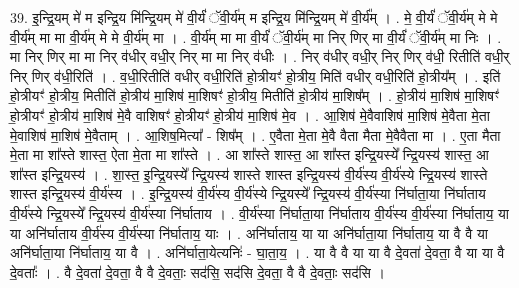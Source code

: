 \documentclass[17pt]{extarticle}
\begin{document}
39. इ॒न्द्रि॒यम् मे॑ म इन्द्रि॒य मि॑न्द्रि॒यम् मे॑ वी॒र्यं॑ ॅवी॒र्य॑म् म इन्द्रि॒य मि॑न्द्रि॒यम् मे॑ वी॒र्य᳚म् । . मे॒ वी॒र्यं॑ ॅवी॒र्य॑म् मे मे वी॒र्य॑म् मा मा वी॒र्य॑म् मे मे वी॒र्य॑म् मा । . वी॒र्य॑म् मा मा वी॒र्यं॑ ॅवी॒र्य॑म् मा निर् णिर् मा वी॒र्यं॑ ॅवी॒र्य॑म् मा निः । . मा निर् णिर् मा मा निर् व॑धीर् वधी॒र् निर् मा मा निर् व॑धीः । . निर् व॑धीर् वधी॒र् निर् णिर् व॑धी॒ रितीति॑ वधी॒र् निर् णिर् व॑धी॒रिति॑ । . व॒धी॒रितीति॑ वधीर् वधी॒रिति॑ हो॒त्रीयꣳ॑ हो॒त्रीय॒ मिति॑ वधीर् वधी॒रिति॑ हो॒त्रीय᳚म् । . इति॑ हो॒त्रीयꣳ॑ हो॒त्रीय॒ मितीति॑ हो॒त्रीय॑ मा॒शिष॑ मा॒शिषꣳ॑ हो॒त्रीय॒ मितीति॑ हो॒त्रीय॑ मा॒शिष᳚म् । . हो॒त्रीय॑ मा॒शिष॑ मा॒शिषꣳ॑ हो॒त्रीयꣳ॑ हो॒त्रीय॑ मा॒शिष॑ मे॒वै वाशिषꣳ॑ हो॒त्रीयꣳ॑ हो॒त्रीय॑ मा॒शिष॑ मे॒व । . आ॒शिष॑ मे॒वैवाशिष॑ मा॒शिष॑ मे॒वैता मे॒ता मे॒वाशिष॑ मा॒शिष॑ मे॒वैताम् । . आ॒शिष॒मित्या᳚ - शिष᳚म् । . ए॒वैता मे॒ता मे॒वै वैता मैता मे॒वैवैता मा । . ए॒ता मैता मे॒ता मा शा᳚स्ते शास्त॒ ऐता मे॒ता मा शा᳚स्ते । . आ शा᳚स्ते शास्त॒ आ शा᳚स्त इन्द्रि॒यस्ये᳚ न्द्रि॒यस्य॑ शास्त॒ आ शा᳚स्त इन्द्रि॒यस्य॑ । . शा॒स्त॒ इ॒न्द्रि॒यस्ये᳚ न्द्रि॒यस्य॑ शास्ते शास्त इन्द्रि॒यस्य॑ वी॒र्य॑स्य वी॒र्य॑स्ये न्द्रि॒यस्य॑ शास्ते शास्त इन्द्रि॒यस्य॑ वी॒र्य॑स्य । . इ॒न्द्रि॒यस्य॑ वी॒र्य॑स्य वी॒र्य॑स्ये न्द्रि॒यस्ये᳚ न्द्रि॒यस्य॑ वी॒र्य॑स्या नि॑र्घाता॒या नि॑र्घाताय वी॒र्य॑स्ये न्द्रि॒यस्ये᳚ न्द्रि॒यस्य॑ वी॒र्य॑स्या नि॑र्घाताय । . वी॒र्य॑स्या नि॑र्घाता॒या नि॑र्घाताय वी॒र्य॑स्य वी॒र्य॑स्या नि॑र्घाताय॒ या या अनि॑र्घाताय वी॒र्य॑स्य वी॒र्य॑स्या नि॑र्घाताय॒ याः । . अनि॑र्घाताय॒ या या अनि॑र्घाता॒या नि॑र्घाताय॒ या वै वै या अनि॑र्घाता॒या नि॑र्घाताय॒ या वै । . अनि॑र्घाता॒येत्यनिः॑ - घा॒ता॒य॒ । . या वै वै या या वै दे॒वता॑ दे॒वता॒ वै या या वै दे॒वताः᳚ । . वै दे॒वता॑ दे॒वता॒ वै वै दे॒वताः॒ सद॑सि॒ सद॑सि दे॒वता॒ वै वै दे॒वताः॒ सद॑सि । \newline
\pagebreak
{}
\end{document}
